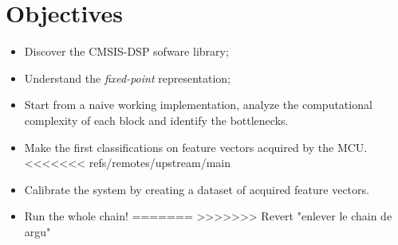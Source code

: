 \section*{Objectives}

\begin{itemize}
    \item Discover the CMSIS-DSP sofware library;
    \item Understand the \emph{fixed-point} representation;
    \item Start from a naive working implementation, analyze the computational complexity of each block and identify the bottlenecks.
    \item Make the first classifications on feature vectors acquired by the MCU.
<<<<<<< refs/remotes/upstream/main
    \item Calibrate the system by creating a dataset of acquired feature vectors.
    \item Run the whole chain!
=======
>>>>>>> Revert "enlever le chain de argu"
\end{itemize}
